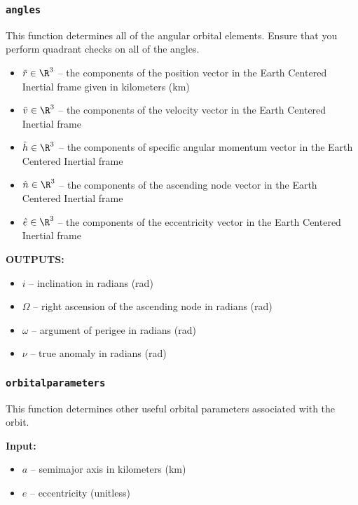 \documentclass[11pt, reqno]{article}    %
\begin{document}
\subsubsection*{\texttt{angles}}

This function determines all of the angular orbital elements. 
Ensure that you perform quadrant checks on all of the angles.

\begin{itemize}
    \item \( \bar r \in \R^{3} \) -- the components of the position vector in the Earth Centered Inertial frame given in kilometers (\si{\kilo\meter})
    \item \( \bar v \in \R^{3} \) -- the components of the velocity vector in the Earth Centered Inertial frame 
    \item \( \hat h \in \R^{3} \) -- the components of specific angular momentum vector in the Earth Centered Inertial frame 
    \item \( \hat n \in \R^{3} \) -- the components of the ascending node vector in the Earth Centered Inertial frame 
    \item \( \hat e \in \R^{3} \) -- the components of the eccentricity vector in the Earth Centered Inertial frame 
\end{itemize}

\noindent \textbf{OUTPUTS:}
\begin{itemize}
    \item \( i \) -- inclination in radians (\si{\radian})
    \item \( \Omega \) -- right ascension of the ascending node in radians (\si{\radian})
    \item \( \omega \) -- argument of perigee in radians (\si{\radian})
    \item \( \nu \) -- true anomaly in radians (\si{\radian})
\end{itemize}

\subsubsection*{\texttt{orbitalparameters}}
This function determines other useful orbital parameters associated with the orbit.

\noindent \textbf{Input:}
\begin{itemize}
    \item \( a \)  -- semimajor axis in kilometers (\si{\kilo\meter})
    \item \( e \) -- eccentricity (unitless)
\end{itemize}
\end{document}
